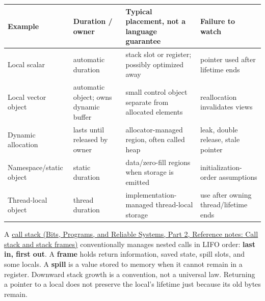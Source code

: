 {\def\LTcaptype{none} %
\begin{longtable}[]{@{}
  >{\raggedright\arraybackslash}p{}
  >{\raggedright\arraybackslash}p{}
  >{\raggedright\arraybackslash}p{}
  >{\raggedright\arraybackslash}p{}@{}}
\toprule\noalign{}
\begin{minipage}[b]{\linewidth}\raggedright
Example
\end{minipage} & \begin{minipage}[b]{\linewidth}\raggedright
Duration / owner
\end{minipage} & \begin{minipage}[b]{\linewidth}\raggedright
Typical placement, not a language guarantee
\end{minipage} & \begin{minipage}[b]{\linewidth}\raggedright
Failure to watch
\end{minipage} \\
\midrule\noalign{}
\endhead
\bottomrule\noalign{}
\endlastfoot
Local scalar & automatic duration & stack slot or register; possibly optimized away & pointer used after lifetime ends \\
Local vector object & automatic object; owns dynamic buffer & small control object separate from allocated elements & reallocation invalidates views \\
Dynamic allocation & lasts until released by owner & allocator-managed region, often called heap & leak, double release, stale pointer \\
Namespace/static object & static duration & data/zero-fill regions when storage is emitted & initialization-order assumptions \\
Thread-local object & thread duration & implementation-managed thread-local storage & use after owning thread/lifetime ends \\
\end{longtable}
}

A \href{../01-Bits-Programs-and-Reliable-Systems-P02/main.pdf\#appendix-b081b7abe193}{call stack (Bits, Programs, and Reliable Systems, Part 2, Reference notes: Call stack and stack frames)} conventionally manages nested calls in LIFO order: \textbf{last in, first out}. A \textbf{frame} holds return information, saved state, spill slots, and some locals. A \textbf{spill} is a value stored to memory when it cannot remain in a register. Downward stack growth is a convention, not a universal law. Returning a pointer to a local does not preserve the local's lifetime just because its old bytes remain.

